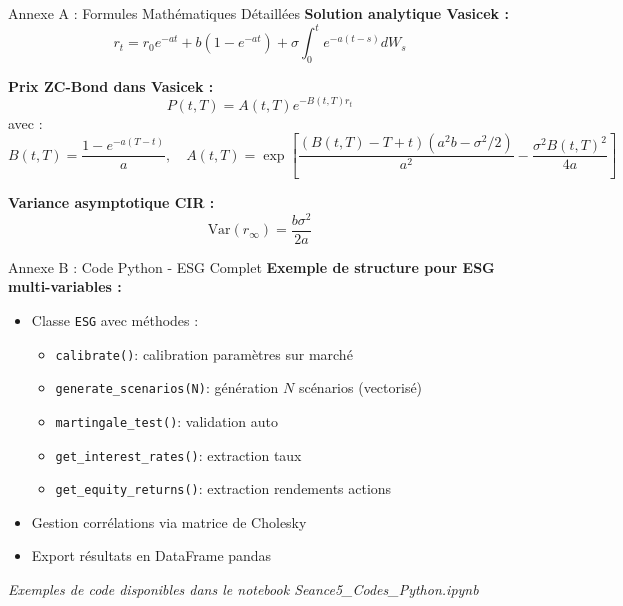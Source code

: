 \documentclass[10pt,aspectratio=169,xcolor={dvipsnames}]{beamer}
\newcommand{\Var}{\text{Var}}
\begin{document}
\appendix

\begin{frame}{Annexe A : Formules Mathématiques Détaillées}
\textbf{Solution analytique Vasicek :}
\[
r_t = r_0 e^{-at} + b(1 - e^{-at}) + \sigma \int_0^t e^{-a(t-s)} dW_s
\]

\vspace{0.3cm}
\textbf{Prix ZC-Bond dans Vasicek :}
\[
P(t, T) = A(t,T) e^{-B(t,T) r_t}
\]
avec :
\[
B(t,T) = \frac{1 - e^{-a(T-t)}}{a}, \quad A(t,T) = \exp\left[\frac{(B(t,T) - T + t)(a^2 b - \sigma^2/2)}{a^2} - \frac{\sigma^2 B(t,T)^2}{4a}\right]
\]

\vspace{0.3cm}
\textbf{Variance asymptotique CIR :}
\[
\Var(r_\infty) = \frac{b\sigma^2}{2a}
\]
\end{frame}

\begin{frame}{Annexe B : Code Python - ESG Complet}
\textbf{Exemple de structure pour ESG multi-variables :}

\begin{itemize}
    \item Classe \texttt{ESG} avec méthodes :
    \begin{itemize}
        \item \texttt{calibrate()}: calibration paramètres sur marché
        \item \texttt{generate\_scenarios(N)}: génération $N$ scénarios (vectorisé)
        \item \texttt{martingale\_test()}: validation auto
        \item \texttt{get\_interest\_rates()}: extraction taux
        \item \texttt{get\_equity\_returns()}: extraction rendements actions
    \end{itemize}
    \item Gestion corrélations via matrice de Cholesky
    \item Export résultats en DataFrame pandas
\end{itemize}

\vspace{0.3cm}
\textit{Exemples de code disponibles dans le notebook Seance5\_Codes\_Python.ipynb}
\end{frame}
\end{document}
